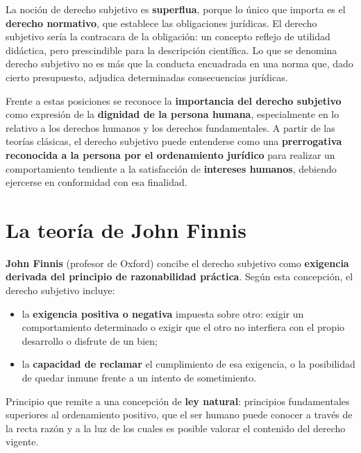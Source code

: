 \documentclass[12pt,oneside]{book}
\begin{document}
\begin{definicion}
La noción de derecho subjetivo es \textbf{superflua}, porque lo único que importa es el \textbf{derecho normativo}, que establece las obligaciones jurídicas. El derecho subjetivo sería la contracara de la obligación: un concepto reflejo de utilidad didáctica, pero prescindible para la descripción científica. Lo que se denomina derecho subjetivo no es más que la conducta encuadrada en una norma que, dado cierto presupuesto, adjudica determinadas consecuencias jurídicas.
\end{definicion}

Frente a estas posiciones se reconoce la \textbf{importancia del derecho subjetivo} como expresión de la \textbf{dignidad de la persona humana}, especialmente en lo relativo a los derechos humanos y los derechos fundamentales. A partir de las teorías clásicas, el derecho subjetivo puede entenderse como una \textbf{prerrogativa reconocida a la persona por el ordenamiento jurídico} para realizar un comportamiento tendiente a la satisfacción de \textbf{intereses humanos}, debiendo ejercerse en conformidad con esa finalidad.

\section{La teoría de John Finnis}

\textbf{John Finnis} (profesor de Oxford) concibe el derecho subjetivo como \textbf{exigencia derivada del principio de razonabilidad práctica}. Según esta concepción, el derecho subjetivo incluye:

\begin{itemize}
\item la \textbf{exigencia positiva o negativa} impuesta sobre otro: exigir un comportamiento determinado o exigir que el otro no interfiera con el propio desarrollo o disfrute de un bien;
\item la \textbf{capacidad de reclamar} el cumplimiento de esa exigencia, o la posibilidad de quedar inmune frente a un intento de sometimiento.
\end{itemize}

\begin{definicion}
Principio que remite a una concepción de \textbf{ley natural}: principios fundamentales superiores al ordenamiento positivo, que el ser humano puede conocer a través de la recta razón y a la luz de los cuales es posible valorar el contenido del derecho vigente.
\end{definicion}
\end{document}
